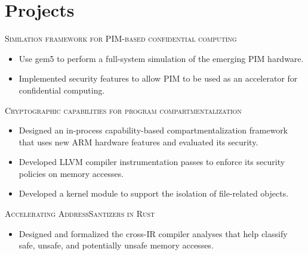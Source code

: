\documentclass[a4paper,12pt]{article}
\begin{document}
\section{Projects}

\textsc{Similation framework for PIM-based confidential computing}
\begin{itemize}[nosep,after=\strut, leftmargin=2em, itemsep=3pt]
	\item Use gem5 to perform a full-system simulation of the emerging PIM hardware.
	\item Implemented security features to allow PIM to be used as an accelerator for confidential computing.
\end{itemize}

\textsc{Cryptographic capabilities for program compartmentalization}
\begin{itemize}[nosep,after=\strut, leftmargin=2em, itemsep=3pt]
	\item Designed an in-process capability-based compartmentalization framework that uses new ARM hardware features and evaluated its security.
	\item Developed LLVM compiler instrumentation passes to enforce its security policies on memory accesses.
	\item Developed a kernel module to support the isolation of file-related objects.
\end{itemize}

\textsc{Accelerating AddressSantizers in Rust}
\begin{itemize}[nosep,after=\strut, leftmargin=2em, itemsep=3pt]
	\item Designed and formalized the cross-IR compiler analyses that help classify safe, unsafe, and potentially unsafe memory accesses.
\end{itemize}





\end{document}
